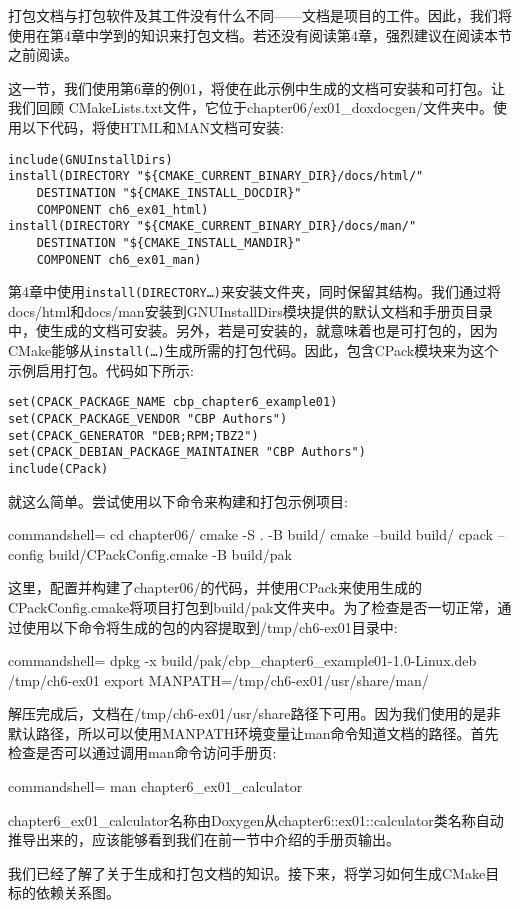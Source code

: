 打包文档与打包软件及其工件没有什么不同——文档是项目的工件。因此，我们将使用在第4章中学到的知识来打包文档。若还没有阅读第4章，强烈建议在阅读本节之前阅读。

这一节，我们使用第6章的例01，将使在此示例中生成的文档可安装和可打包。让我们回顾 CMakeLists.txt文件，它位于chapter06/ex01\_doxdocgen/文件夹中。使用以下代码，将使HTML和MAN文档可安装:

\begin{lstlisting}[style=styleCMake]
include(GNUInstallDirs)
install(DIRECTORY "${CMAKE_CURRENT_BINARY_DIR}/docs/html/"
	DESTINATION "${CMAKE_INSTALL_DOCDIR}"
	COMPONENT ch6_ex01_html)
install(DIRECTORY "${CMAKE_CURRENT_BINARY_DIR}/docs/man/"
	DESTINATION "${CMAKE_INSTALL_MANDIR}"
	COMPONENT ch6_ex01_man)
\end{lstlisting}

第4章中使用\texttt{install(DIRECTORY…)}来安装文件夹，同时保留其结构。我们通过将docs/html和docs/man安装到GNUInstallDirs模块提供的默认文档和手册页目录中，使生成的文档可安装。另外，若是可安装的，就意味着也是可打包的，因为CMake能够从\texttt{install(…)}生成所需的打包代码。因此，包含CPack模块来为这个示例启用打包。代码如下所示:

\begin{lstlisting}[style=styleCMake]
set(CPACK_PACKAGE_NAME cbp_chapter6_example01)
set(CPACK_PACKAGE_VENDOR "CBP Authors")
set(CPACK_GENERATOR "DEB;RPM;TBZ2")
set(CPACK_DEBIAN_PACKAGE_MAINTAINER "CBP Authors")
include(CPack)
\end{lstlisting}

就这么简单。尝试使用以下命令来构建和打包示例项目:

\begin{tcblisting}{commandshell={}}
cd chapter06/
cmake -S . -B build/
cmake --build build/
cpack --config build/CPackConfig.cmake -B build/pak
\end{tcblisting}

这里，配置并构建了chapter06/的代码，并使用CPack来使用生成的CPackConfig.cmake将项目打包到build/pak文件夹中。为了检查是否一切正常，通过使用以下命令将生成的包的内容提取到/tmp/ch6-ex01目录中:

\begin{tcblisting}{commandshell={}}
dpkg -x build/pak/cbp_chapter6_example01-1.0-Linux.deb
  /tmp/ch6-ex01
export MANPATH=/tmp/ch6-ex01/usr/share/man/
\end{tcblisting}

解压完成后，文档在/tmp/ch6-ex01/usr/share路径下可用。因为我们使用的是非默认路径，所以可以使用MANPATH环境变量让man命令知道文档的路径。首先检查是否可以通过调用man命令访问手册页:

\begin{tcblisting}{commandshell={}}
man chapter6_ex01_calculator
\end{tcblisting}

chapter6\_ex01\_calculator名称由Doxygen从chapter6::ex01::calculator类名称自动推导出来的，应该能够看到我们在前一节中介绍的手册页输出。

我们已经了解了关于生成和打包文档的知识。接下来，将学习如何生成CMake目标的依赖关系图。




